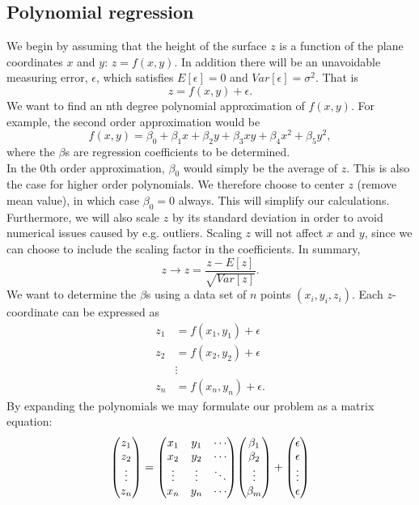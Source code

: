 \documentclass[notitlepage, reprint, nofootinbib]{revtex4-1}
\begin{document}
\subsection{Polynomial regression}
We begin by assuming that the height of the surface $z$ is a function of the plane coordinates $x$ and $y$: $z=f(x,y)$. In addition there will be an unavoidable measuring error, $\epsilon$, which satisfies $E[\epsilon]=0$ and $Var[\epsilon]=\sigma^2$. That is
\begin{equation}\label{eq1}z=f(x,y)+\epsilon.\end{equation}
We want to find an nth degree polynomial approximation of $f(x,y)$. For example, the second order approximation would be
\begin{equation}f(x,y)=\beta_0+\beta_1x+\beta_2y+\beta_3xy+\beta_4x^2+\beta_5y^2,\end{equation}
where the $\beta$s are regression coefficients to be determined. \\[2mm]
In the 0th order approximation, $\beta_0$ would simply be the average of $z$. This is also the case for higher order polynomials. We therefore choose to center $z$ (remove mean value), in which case $\beta_0=0$ always. This will simplify our calculations. Furthermore, we will also scale $z$ by its standard deviation in order to avoid numerical issues caused by e.g. outliers. Scaling $z$ will not affect $x$ and $y$, since we can choose to include the scaling factor in the coefficients. In summary,  
\begin{equation}z\rightarrow z=\frac{z-E[z]}{\sqrt{Var[z]}}.\end{equation}
We want to determine the $\beta$s using a data set of $n$ points $(x_i, y_i, z_i)$. Each $z$-coordinate can be expressed as 
\begin{align*}
	z_1 &= f(x_1, y_1)+\epsilon\\
	z_2 &=f(x_2, y_2)+\epsilon\\
	&\vdots\\
	z_n&=f(x_n,y_n)+\epsilon.
\end{align*}
By expanding the polynomials we may formulate our problem as a matrix equation: 
\begin{equation} \mqty(z_1 \\z_2\\ \vdots\\z_n) = \mqty(x_1 & y_1 & \cdots \\ x_2 & y_2 &\cdots \\ \vdots &\vdots&\ddots\\x_n&y_n&\cdots) \mqty(\beta_1\\ \beta_2\\ \vdots\\ \beta_m)+\mqty(\epsilon\\ \epsilon\\ \vdots\\ \epsilon)\end{equation} 
\end{document}
